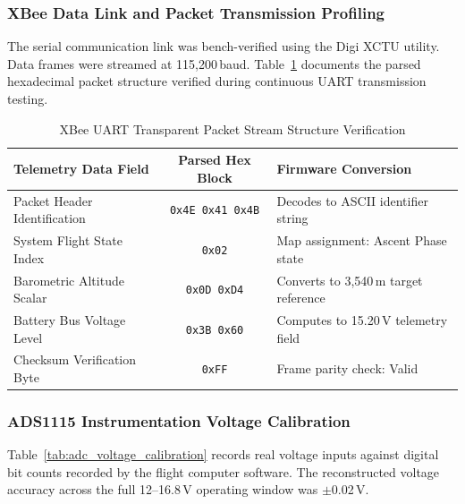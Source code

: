 \subsubsection{XBee Data Link and Packet Transmission Profiling}

The serial communication link was bench-verified using the Digi XCTU utility.
Data frames were streamed at 115{,}200\,baud. Table~\ref{tab:xctu_data_stream}
documents the parsed hexadecimal packet structure verified during continuous UART
transmission testing.

\begin{table}[!htbp]
  \centering
  \caption{XBee UART Transparent Packet Stream Structure Verification}
  \label{tab:xctu_data_stream}
  \small
  \renewcommand{\arraystretch}{1.2}
  \begin{tabular}{@{}l|c|l@{}}
    \toprule
    \rowcolor{gray!22}\textbf{Telemetry Data Field} & \textbf{Parsed Hex Block} & \textbf{Firmware Conversion} \\ \midrule
    Packet Header Identification & \texttt{0x4E 0x41 0x4B} & Decodes to ASCII identifier string \\
    System Flight State Index & \texttt{0x02} & Map assignment: Ascent Phase state \\
    Barometric Altitude Scalar & \texttt{0x0D 0xD4} & Converts to 3{,}540\,m target reference \\
    Battery Bus Voltage Level & \texttt{0x3B 0x60} & Computes to 15.20\,V telemetry field \\
    Checksum Verification Byte & \texttt{0xFF} & Frame parity check: Valid \\ \bottomrule
  \end{tabular}
\end{table}

\subsubsection{ADS1115 Instrumentation Voltage Calibration}

Table~\ref{tab:adc_voltage_calibration} records real voltage inputs against
digital bit counts recorded by the flight computer software. The reconstructed
voltage accuracy across the full 12--16.8\,V operating window was $\pm$0.02\,V.

